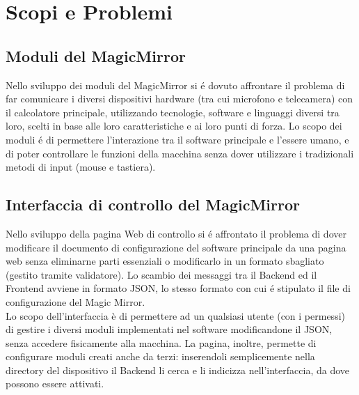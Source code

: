 \chapter{Scopi e Problemi}

\section{Moduli del MagicMirror}
Nello sviluppo dei moduli del MagicMirror si \'e dovuto affrontare il problema di far comunicare
i diversi dispositivi hardware (tra cui microfono e telecamera) con il calcolatore principale, utilizzando tecnologie,
software e linguaggi diversi tra loro, scelti in base alle loro caratteristiche e ai loro punti di forza.
Lo scopo dei moduli \'e di permettere l'interazione tra il software principale
e l'essere umano, e di poter controllare le funzioni della macchina senza dover utilizzare
i tradizionali metodi di input (mouse e tastiera).
\\[2\baselineskip]
\section{Interfaccia di controllo del MagicMirror}
Nello sviluppo della pagina Web di controllo si \'e affrontato il problema di dover modificare
il documento di configurazione del software principale da una pagina web senza eliminarne parti essenziali
o modificarlo in un formato sbagliato (gestito tramite validatore).
Lo scambio dei messaggi tra il Backend ed il Frontend avviene in formato JSON, lo stesso formato
con cui \'e stipulato il file di configurazione del Magic Mirror.\\
Lo scopo dell'interfaccia è di permettere ad un qualsiasi utente (con i permessi) di gestire
i diversi moduli implementati nel software modificandone il JSON, senza accedere fisicamente alla macchina.
La pagina, inoltre, permette di configurare moduli creati anche da terzi: inserendoli
semplicemente nella directory del dispositivo il Backend li cerca e li indicizza nell'interfaccia,
da dove possono essere attivati.
